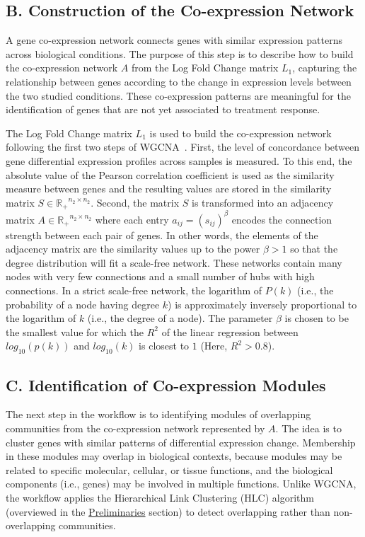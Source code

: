\subsection*{B. Construction of the Co-expression Network}

A gene co-expression network connects genes with similar expression
patterns across biological conditions. The purpose of this step is to
describe how to build the co-expression network $A$ from the Log Fold
Change matrix $L_1$, capturing the relationship between genes
according to the change in expression levels between the two studied
conditions. These co-expression patterns are meaningful for the
identification of genes that are not yet associated to treatment response.
\vspace{0.5cm}

The Log Fold Change matrix $L_1$ is used to build the co-expression
network following the first two steps of WGCNA~\cite{langfelder2008wgcna}.
First, the level of
concordance between gene differential expression profiles across
samples is measured. To this end, the absolute value of the Pearson
correlation coefficient is used as the similarity measure between
genes and the resulting values are stored in the similarity matrix
$S\in \mathbb{R_{+}}^{n_2 \times n_2}$. Second, the matrix $S$ is
transformed into an adjacency matrix $A \in \mathbb{R_+}^{n_2\times
  n_2}$ where each entry $a_{ij} = (s_{ij})^\beta $ encodes the
connection strength between each pair of genes. In other words, the
elements of the adjacency matrix are the similarity values up to the
power $\beta > 1$ so that the degree distribution will fit a
scale-free network. These networks contain many nodes with very few
connections and a small number of hubs with high connections. In a
strict scale-free network, the logarithm of $P(k)$ (i.e., the
probability of a node having degree $k$) is approximately inversely
proportional to the logarithm of $k$ (i.e., the degree of a node).
The parameter $\beta$ is chosen to be the smallest value for which the
$R^2$ of the linear regression between $log_{10}(p(k))$ and
$log_{10}(k)$ is closest to $1$ (Here, $R^2 > 0.8$).

\subsection*{C. Identification of Co-expression Modules}

The next step in the workflow is to identifying modules of overlapping communities
from the co-expression network
represented by $A$.  The idea is to cluster genes with similar
patterns of differential expression change. Membership in these
modules may overlap in biological contexts, because modules may be
related to specific molecular, cellular, or tissue functions, and the
biological components (i.e., genes) may be involved in multiple
functions. Unlike WGCNA, the workflow applies 
the Hierarchical Link Clustering (HLC) algorithm (overviewed in the 
\hyperref[sec.prelim]{Preliminaries} section) to
detect overlapping rather than non-overlapping communities.
\vspace{0.5cm}

